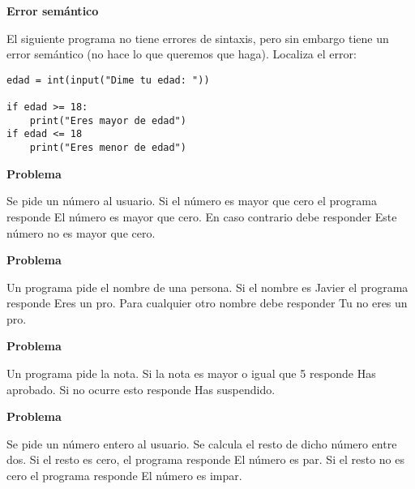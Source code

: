\documentclass[a4paper, 11pt]{scrartcl}
\newenvironment{code}{\begin{tcolorbox}[colback=red!2!white]}{\end{tcolorbox}}
\begin{document}
\noindent\textbf{\sffamily Error semántico}

El siguiente programa no tiene errores de sintaxis, pero sin embargo tiene un error semántico (no hace lo que queremos que haga). Localiza el error:

\smallskip

\begin{code}

\begin{verbatim}
edad = int(input("Dime tu edad: "))

if edad >= 18:
	print("Eres mayor de edad")
if edad <= 18
	print("Eres menor de edad")
\end{verbatim}

\end{code}







\noindent\textbf{\sffamily Problema}

Se pide un número al usuario. Si el número es mayor que cero el programa responde \guillemotleft El número es mayor que cero\guillemotright. En caso contrario debe responder \guillemotleft Este número no es mayor que cero\guillemotright.







\noindent\textbf{\sffamily Problema}

Un programa pide el nombre de una persona. Si el nombre es \guillemotleft Javier\guillemotright{} el programa responde \guillemotleft Eres un pro\guillemotright. Para cualquier otro nombre debe responder \guillemotleft Tu no eres un pro\guillemotright.






\noindent\textbf{\sffamily Problema}

Un programa pide la nota. Si la nota es mayor o igual que 5 responde \guillemotleft Has aprobado\guillemotright. Si no ocurre esto responde \guillemotleft Has suspendido\guillemotright.






\noindent\textbf{\sffamily Problema}


Se pide un número entero al usuario. Se calcula el resto de dicho número entre dos. Si el resto es cero, el programa responde \guillemotleft El número es par\guillemotleft. Si el resto no es cero el programa responde \guillemotleft El número es impar\guillemotright.
\end{document}
